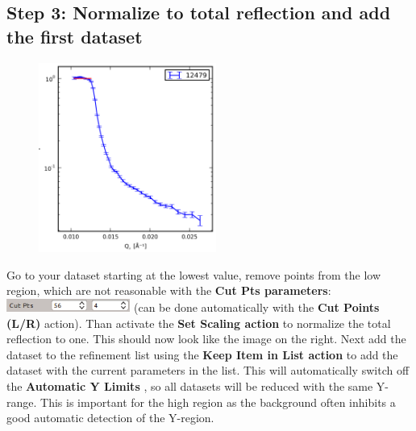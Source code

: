   \subsection{Step 3: Normalize to total reflection and add the first dataset}
    \begin{figure}
     \includegraphics[width=165pt]{screenshots/totalreflection.png} 
    \end{figure}
    Go to your dataset starting at the lowest \Qz value, remove points from the low \Qz region, which are not reasonable with the \textbf{Cut Pts parameters}:
    \includegraphics[width=115pt]{screenshots/cutpoints.png} (can be done automatically with the \textbf{Cut Points (L/R)}  action). Than activate the \textbf{Set Scaling action}  to normalize the total reflection to one.
    This should now look like the image on the right.
    Next add the dataset to the refinement list using the \textbf{Keep Item in List action}  to add the dataset with the current parameters in the list.
    This will automatically switch off the \textbf{Automatic Y Limits} , so all datasets will be reduced with the same Y-range.
    This is important for the high \Qz region as the background often inhibits a good automatic detection of the Y-region.
    
  
